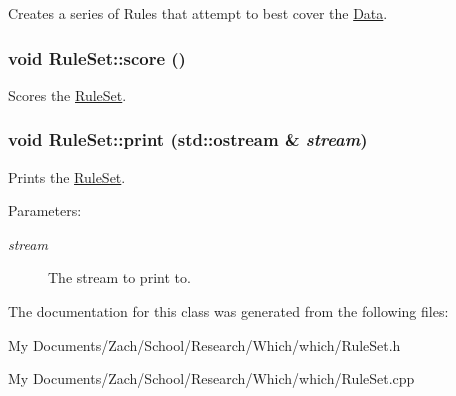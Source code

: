 Creates a series of Rules that attempt to best cover the \hyperlink{class_data}{Data}. \hypertarget{class_rule_set_303fc2e6ff151614cf3b3695bab76cf3}{
\subsubsection{\setlength{\rightskip}{0pt plus 5cm}void RuleSet::score ()}}
\label{class_rule_set_303fc2e6ff151614cf3b3695bab76cf3}


Scores the \hyperlink{class_rule_set}{RuleSet}. \hypertarget{class_rule_set_f2924a75e022901e54f248d380c97944}{
\subsubsection{\setlength{\rightskip}{0pt plus 5cm}void RuleSet::print (std::ostream \& {\em stream})}}
\label{class_rule_set_f2924a75e022901e54f248d380c97944}


Prints the \hyperlink{class_rule_set}{RuleSet}. \begin{Desc}
\item[Parameters:]
\begin{description}
\item[{\em stream}]The stream to print to. \end{description}
\end{Desc}


The documentation for this class was generated from the following files:\begin{CompactItemize}
\item 
My Documents/Zach/School/Research/Which/which/RuleSet.h\item 
My Documents/Zach/School/Research/Which/which/RuleSet.cpp\end{CompactItemize}
